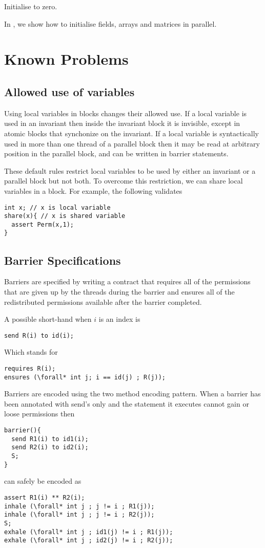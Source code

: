 \begin{listing}

\caption{Initialise to zero.}
\label{zero-many}
\end{listing}

In , we show how to initialise fields, arrays and matrices in parallel.

\section{Known Problems}

\subsection{Allowed use of variables}

Using local variables in blocks changes their allowed use.
If a local variable is used in an invariant then inside the invariant block it is invisible,
except in atomic blocks that synchonize on the invariant.
If a local variable is syntactically used in more than one thread of a
parallel block then it may be read at arbitrary position
in the parallel block, and can be written in barrier
statements.

These default rules restrict local variables to be used by either an invariant
or a parallel block but not both. To overcome this restriction, we can share local
variables in a block. For example, the following validates
\begin{lstlisting}
int x; // x is local variable
share(x){ // x is shared variable
  assert Perm(x,1);
}
\end{lstlisting}

\subsection{Barrier Specifications}

Barriers are specified by writing a contract that requires
all of the permissions that are given up by the threads
during the barrier and ensures all of the redistributed permissions
available after the barrier completed.

A possible short-hand when $i$ is an index is
\begin{lstlisting}
send R(i) to id(i);
\end{lstlisting}
Which stands for
\begin{lstlisting}
requires R(i);
ensures (\forall* int j; i == id(j) ; R(j));
\end{lstlisting}

Barriers are encoded using the two method encoding pattern.
When a barrier has been annotated with send's only
and the statement it executes cannot gain or loose permissions
then
\begin{lstlisting}
barrier(){
  send R1(i) to id1(i);
  send R2(i) to id2(i);
  S;
}
\end{lstlisting}
can safely be encoded as
\begin{lstlisting}
assert R1(i) ** R2(i);
inhale (\forall* int j ; j != i ; R1(j));
inhale (\forall* int j ; j != i ; R2(j));
S;
exhale (\forall* int j ; id1(j) != i ; R1(j));
exhale (\forall* int j ; id2(j) != i ; R2(j));
\end{lstlisting}

